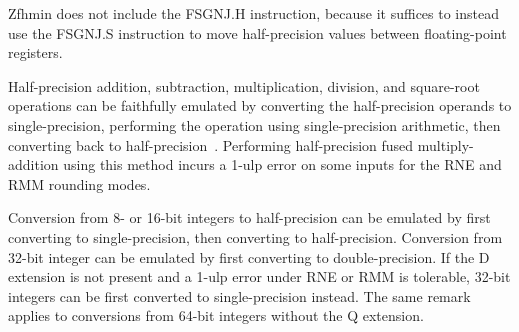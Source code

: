 \begin{commentary}
Zfhmin does not include the FSGNJ.H instruction, because it suffices to
instead use the FSGNJ.S instruction to move half-precision values between
floating-point registers.
\end{commentary}

\begin{commentary}
Half-precision addition, subtraction, multiplication, division, and
square-root operations can be faithfully emulated by converting the
half-precision operands to single-precision, performing the operation
using single-precision arithmetic, then converting back to
half-precision~\cite{roux:hal-01091186}.
Performing half-precision fused multiply-addition using this method incurs
a 1-ulp error on some inputs for the RNE and RMM rounding modes.

Conversion from 8- or 16-bit integers to half-precision can be emulated by
first converting to single-precision, then converting to half-precision.
Conversion from 32-bit integer can be emulated by first converting to
double-precision.
If the D extension is not present and a 1-ulp error under RNE or RMM is
tolerable, 32-bit integers can be first converted to single-precision instead.
The same remark applies to conversions from 64-bit integers without the Q
extension.
\end{commentary}
